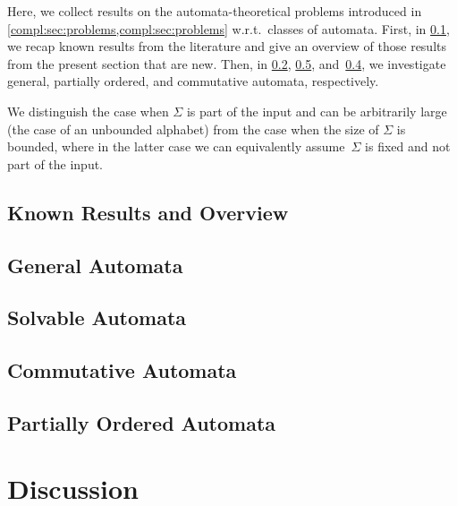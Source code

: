 
Here, we collect results
on the automata-theoretical problems introduced
in \cref{compl:sec:problems,compl:sec:problems} w.r.t.~classes of automata.
First, in \cref{compl:sec:subclasses:known-results}, 
we recap known results from the literature
and give an overview of those results from the present
section that are new.
Then, in \cref{compl:sec:general}, \ref{compl:sec:pto}, and~\ref{comp:sec:comm}, 
we investigate general, partially ordered, and commutative automata, respectively. %

We distinguish the case when $\Sigma$ is part of the input and can be arbitrarily large (the case of an unbounded alphabet)
from the case when the size of $\Sigma$ is bounded, where in the latter case
we can equivalently assume~$\Sigma$ is fixed and not part of the input.

\subsection{Known Results and Overview}
\label{compl:sec:subclasses:known-results}



\subsection{General Automata}
\label{compl:sec:general} 



\subsection{Solvable Automata}
\label{compl:sec:solv} 



\subsection{Commutative Automata}
\label{comp:sec:comm}



\subsection{Partially Ordered Automata}
\label{compl:sec:pto}



\section{Discussion}
\label{prelim:compl:sec:discussion}

